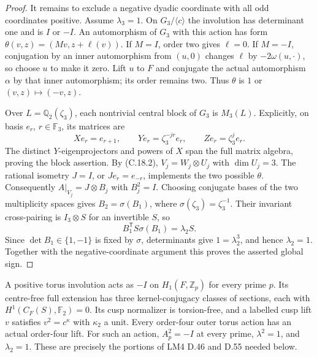 \begin{proof}
It remains to exclude a negative dyadic coordinate
with all odd coordinates positive.  Assume
$\lambda_3=1$.  On $G_3/\langle c\rangle$ the
involution has determinant one and is $I$ or $-I$.
An automorphism of $G_3$ with this action has form
$\theta(v,z)=(Mv,z+\ell(v))$.  If $M=I$, order two
gives $\ell=0$.  If $M=-I$, conjugation by an inner
automorphism from $(u,0)$ changes $\ell$ by
$-2\omega(u,\cdot)$, so choose $u$ to make it zero.
Lift $u$ to $F$ and conjugate the actual automorphism
$\alpha$ by that inner automorphism; its order remains
two.  Thus $\theta$ is $1$ or $(v,z)\mapsto(-v,z)$.

Over $L=\mathbb Q_2(\zeta_3)$, each nontrivial central
block of $G_3$ is $M_3(L)$.  Explicitly, on basis
$e_r$, $r\in\mathbb F_3$, its matrices are
\[
 Xe_r=e_{r+1},\qquad Ye_r=\zeta_3^{-jr}e_r,
                    \qquad Ze_r=\zeta_3^je_r.
\]
The distinct $Y$-eigenprojectors and powers of $X$
span the full matrix algebra, proving the block
assertion.  By (C.18.2), $V_j=W_j\otimes U_j$ with
$\dim U_j=3$.  The rational isometry $J=I$, or
$Je_r=e_{-r}$, implements the two possible $\theta$.
Consequently $A|_{V_j}=J\otimes B_j$ with $B_j^2=I$.
Choosing conjugate bases of the two multiplicity spaces
gives $B_2=\sigma(B_1)$, where
$\sigma(\zeta_3)=\zeta_3^{-1}$.  Their invariant
cross-pairing is $I_3\otimes S$ for an invertible $S$,
so
\[
 B_1^{\mathsf T}S\sigma(B_1)=\lambda_2 S.
\]
Since $\det B_1\in\{1,-1\}$ is fixed by $\sigma$,
determinants give $1=\lambda_2^3$, and hence
$\lambda_2=1$.  Together with the negative-coordinate
argument this proves the asserted global sign.
\end{proof}

A positive torus involution acts as $-I$ on
$H_1(F,\mathbb Z_p)$ for every prime $p$.  Its
centre-free full extension has three kernel-conjugacy
classes of sections, each with
$H^1(C_F(S),\mathbb F_2)=0$.  Its cusp normalizer is
torsion-free, and a labelled cusp lift $v$ satisfies
$v^2=c^\kappa$ with $\kappa_2$ a unit.
Every order-four outer torus action has an actual
order-four lift.  For such an action,
$A_p^2=-I$ at every prime, $\lambda^2=1$, and
$\lambda_2=1$.  These are precisely the portions of
LM4 D.46 and D.55 needed below.

